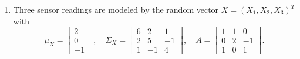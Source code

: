 \documentclass[11pt]{article}
\newcommand{\solution}{
    \vspace{0.3cm}
    \noindent\textbf{\textcolor{blue}{Solution:}}
    \vspace{0.3cm}
}
\begin{document}
\begin{enumerate}[label=\textbf{Question-\arabic*:}, leftmargin=*]
\[\[Compute:
\begin{enumerate}[label=(\alph*)]
    \item the mean vector $\mu_Y$,
    \item the covariance matrix $\Sigma_Y$,
    \item the variance of $Y_1+Y_2$.
\end{enumerate}

\solution

\textbf{(a) Mean vector}

\[
\mu_Y = A\mu_X =
\begin{bmatrix}
1 & 2 & 0\\
0 & -1 & 1\\
2 & 0 & 1
\end{bmatrix}
\begin{bmatrix}
1\\
-1\\
2
\end{bmatrix}
=
\begin{bmatrix}
-1\\
3\\
4
\end{bmatrix}
\]

\textbf{(b) Covariance matrix}

\[
\Sigma_Y = A\Sigma_X A^T
\]

\[
\Sigma_Y =
\begin{bmatrix}
20 & -9 & 10\\
-9 & 10 & 4\\
10 & 4 & 21
\end{bmatrix}
\]

\textbf{(c) Variance of $Y_1+Y_2$}

\[
\mathrm{Var}(Y_1+Y_2)
= \Sigma_{11} + \Sigma_{22} + 2\Sigma_{12}
= 20 + 10 + 2(-9)
= 12
\]


\newpage

\item Three sensor readings are modeled by the random vector $X=(X_1,X_2,X_3)^T$ with
\[
\mu_X =
\begin{bmatrix}2\\0\\-1\end{bmatrix},\quad
\Sigma_X =
\begin{bmatrix}6&2&1\\2&5&-1\\1&-1&4\end{bmatrix},\quad
A =
\begin{bmatrix}1&1&0\\0&2&-1\\1&0&1\end{bmatrix}.
\]

\]\]
\end{enumerate}
\end{document}
